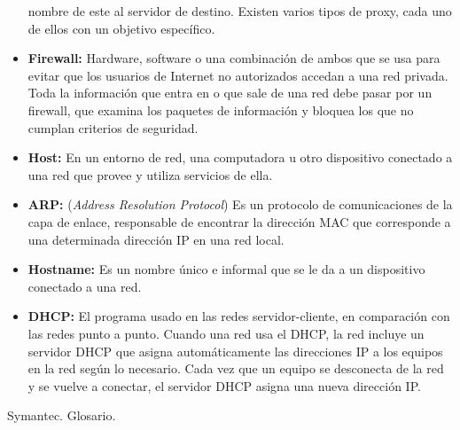 \documentclass[a4paper,12pt]{article}
\begin{document}
\begin{itemize}
 nombre de este al servidor de destino. Existen varios tipos de proxy, cada uno de ellos con un objetivo específico.
 \item \textbf{Firewall: } Hardware, software o una combinación de ambos que se usa para evitar que los usuarios de Internet no autorizados accedan a una red privada. Toda la información que entra en o que sale de una
 red debe pasar por un firewall, que examina los paquetes de información y bloquea los que no cumplan criterios de seguridad.
 \item \textbf{Host: } En un entorno de red, una computadora u otro dispositivo conectado a una red que provee y utiliza servicios de ella. 
 \item \textbf{ARP: } (\textit{Address Resolution Protocol}) Es un protocolo de comunicaciones de la capa de enlace, responsable de encontrar la dirección MAC que corresponde a una determinada dirección IP en una red local.
 \item \textbf{Hostname: } Es un nombre único e informal que se le da a un dispositivo conectado a una red.
 \item \textbf{DHCP: } El programa usado en las redes servidor-cliente, en comparación con las redes punto a punto. Cuando una red usa el DHCP, la red incluye un servidor DHCP que asigna automáticamente las direcciones IP a los equipos en la
 red según lo necesario. Cada vez que un equipo se desconecta de la red y se vuelve a conectar, el servidor DHCP asigna una nueva dirección IP.
\end{itemize}

\begin{thebibliography}{1}

 Symantec. Glosario.

 
\end{thebibliography}
\end{document}
